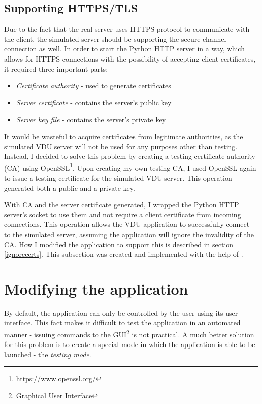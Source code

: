 \subsection{Supporting HTTPS/TLS}
Due to the fact that the real server uses HTTPS protocol to communicate with the client, the simulated server should be supporting the secure channel connection as well. In order to start the Python HTTP server in a way, which allows for HTTPS connections with the possibility of accepting client certificates, it required three important parts:
\begin{itemize}
    \item \textit{Certificate authority} - used to generate certificates
    \item \textit{Server certificate} - contains the server's public key
    \item \textit{Server key file} - contains the server's private key
\end{itemize}
It would be wasteful to acquire certificates from legitimate authorities, as the simulated VDU server will not be used for any purposes other than testing. Instead, I decided to solve this problem by creating a testing certificate authority (CA) using OpenSSL\footnote{\url{https://www.openssl.org/}}. Upon creating my own testing CA, I used OpenSSL again to issue a testing certificate for the simulated VDU server. This operation generated both a public and a private key. 

With CA and the server certificate generated, I wrapped the Python HTTP server's socket to use them and not require a client certificate from incoming connections. This operation allows the VDU application to successfully connect to the simulated server, assuming the application will ignore the invalidity of the CA. How I modified the application to support this is described in section \ref{ignorecerts}.
This subsection was created and implemented with the help of \cite{SSLCertTut}.
\section{Modifying the application}
By default, the application can only be controlled by the user using its user interface. This fact makes it difficult to test the application in an automated manner - issuing commands to the GUI\footnote{Graphical User Interface} is not practical. A much better solution for this problem is to create a special mode in which the application is able to be launched - the \textit{testing mode}.

